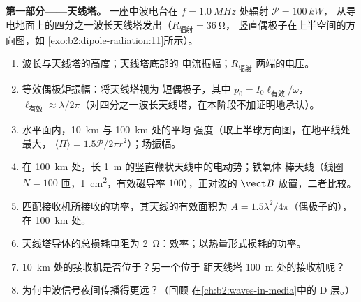 \begin{problem}
\label{pb:b2:dipole-radiation:1}

\medskip
\noindent\textbf{第一部分——天线塔。}
一座中波电台在 $f = \qty{1.0}{MHz}$ 处辐射 $\mathcal P = \qty{100}{kW}$，
从导电地面上的四分之一波长天线塔发出（$R_{\text{辐射}} = \qty{36}{\ohm}$，
竖直偶极子在上半空间的方向图，如
\cref{exo:b2:dipole-radiation:11}所示）。
\begin{enumerate}
  \item 波长与天线塔的高度；天线塔底部的
        电流振幅；$R_{\text{辐射}}$ 两端的电压。
  \item 等效偶极矩振幅：将天线塔视为
        短偶极子，其中 $p_0 = I_0\ell_{\text{有效}}/\omega$，$\ell_{\text{有效}} \approx
        \lambda/2\pi$（对四分之一波长天线塔，在本阶段不加证明地承认）。
  \item 水平面内，\qty{10}{km} 与 \qty{100}{km} 处的平均
        强度（取上半球方向图，在地平线处最大，
        $\langle\Pi\rangle = 1.5\mathcal P/2\pi r^2$）；场振幅。
  \item 在 \qty{100}{km} 处，长 \qty{1}{m} 的竖直鞭状天线中的电动势；铁氧体
        棒天线（线圈 $N = 100$ 匝，\qty{1}{cm^2}，有效磁导率
        $100$），正对波的 $\vect B$ 放置，二者比较。
  \item 匹配接收机所接收的功率，其天线的有效面积为
        $A = 1.5\lambda^2/4\pi$（偶极子的），在 \qty{100}{km} 处。
  \item 天线塔导体的总损耗电阻为
        \qty{2}{\ohm}：效率；以热量形式损耗的功率。
  \item \qty{10}{km} 处的接收机是否位于？另一个位于
        距天线塔 \qty{100}{m} 处的接收机呢？
  \item 为何中波信号夜间传播得更远？（回顾
        在\cref{ch:b2:waves-in-media}中的 D 层。）
\end{enumerate}


\end{problem}
